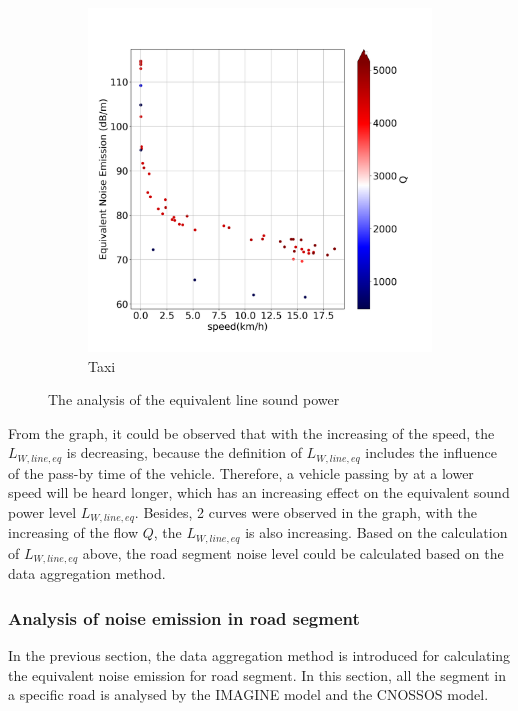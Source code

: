 \documentclass{article}
\begin{document}
\begin{figure}[h]
\begin{subfigure}[h]{0.47\textwidth}
         \includegraphics[width=\textwidth]{emission-speed-flow(Taxi).png}
         \caption{Taxi}
         \label{L2R}
     \end{subfigure}
\caption{The analysis of the equivalent line sound power}
\label{line sound power}
\end{figure}

\noindent From the graph, it could be observed that with the increasing of the speed, the $L_{W,line,eq}$ is decreasing, because the definition of $L_{W,line,eq}$ includes the influence of the pass-by time of the vehicle. Therefore, a vehicle passing by at a lower speed will be heard longer, which has an increasing effect on the equivalent sound power level $L_{W,line,eq}$. Besides, 2 curves were observed in the graph, with the increasing of the flow $Q$, the $L_{W,line,eq}$ is also increasing.
\noindent Based on the calculation of $L_{W,line,eq}$ above, the road segment noise level could be calculated based on the data aggregation method.
\newpage
\subsubsection{Analysis of noise emission in road segment }

\noindent In the previous section, the data aggregation method is introduced for calculating the equivalent noise emission for road segment. In this section, all the segment in a specific road is analysed by the IMAGINE model and the CNOSSOS model.
\end{document}
